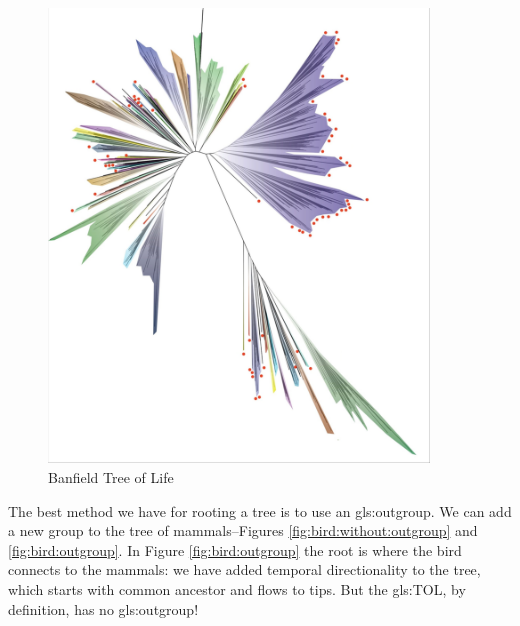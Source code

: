\documentclass[]{article}
\begin{document}
\begin{figure}[H]
	\caption[Banfield Tree of Life]{Banfield Tree of Life\cite{hug2016new}}\label{fig:banfield:tol}
	\includegraphics[width=0.9\textwidth]{TOL4}
\end{figure}

The best method we have for rooting a tree is to use an \gls{gls:outgroup}. We can add a new group to the tree of mammals--Figures \ref{fig:bird:without:outgroup} and \ref{fig:bird:outgroup}. In Figure \ref{fig:bird:outgroup} the root is where the bird connects to the mammals: we have added temporal directionality to the tree, which starts with common ancestor and flows to tips. But the \gls{gls:TOL}, by definition, has no \gls{gls:outgroup}!
\end{document}
